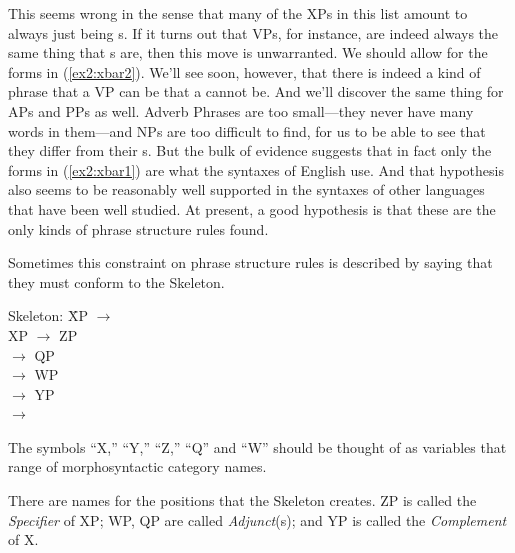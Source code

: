 This seems wrong in the sense that many of the XPs in this list amount to always just being s. If it turns out that VPs, for instance, are indeed always the same thing that s are, then this move is unwarranted. We should allow for the forms in (\ref{ex2:xbar2}). We'll see soon, however, that there is indeed a kind of phrase that a VP can be that a  cannot be. And we'll discover the same thing for APs and PPs as well. Adverb Phrases are too small---they never have many words in them---and NPs are too difficult to find, for us to be able to see that they differ from their s. But the bulk of evidence suggests that in fact only the forms in (\ref{ex2:xbar1}) are what the syntaxes of English use. And that hypothesis also seems to be reasonably well supported in the syntaxes of other languages that have been well studied. At present, a good hypothesis is that these are the only kinds of phrase structure rules found.
\enlargethispage*{20pt}

Sometimes this constraint on phrase structure rules is described by saying that they must conform to the  Skeleton.
\begin{exe}
	\ex \label{ex2:skeleton} 
	\begin{tabbing}
	 Skeleton: \= XP $\rightarrow$ \\
	 \> XP $\rightarrow$ ZP \\
				\> $\rightarrow$ QP \\ 
				\>\ibar{X} $\rightarrow$  WP\\ 
				\> $\rightarrow$  YP\\
				\> $\rightarrow$ 
	\end{tabbing}
\end{exe}
The symbols ``X,'' ``Y,'' ``Z,'' ``Q'' and ``W'' should be thought of as variables that range of morphosyntactic category names. 

There are names for the positions that the  Skeleton creates. ZP is called the \emph{Specifier} of XP; WP, QP are called \emph{Adjunct}(s); and YP is called the \emph{Complement} of X.%
%
%
%

